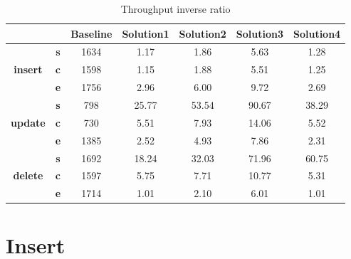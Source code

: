 \begin{table}[h]
\newcommand{\B}[1]{\colorbox{light-gray}{#1}}
 \centering
\caption{Throughput inverse ratio}\label{t:}
\begin{tabular}{ccccccc}
\toprule
&&\textbf{Baseline} & \textbf{Solution1} & \textbf{Solution2} & \textbf{Solution3} & \textbf{Solution4}\\
\midrule
\multirow{3}{*}{\textbf{insert}} & \textbf{s} & 1634 & 1.17 & 1.86 & 5.63 & 1.28\\
 & \textbf{c} & 1598 & 1.15 & 1.88 & 5.51 & 1.25\\
 & \textbf{e} & 1756 & 2.96 & 6.00 & 9.72 & 2.69\\
\midrule
\multirow{3}{*}{\textbf{update}} & \textbf{s} & 798 & 25.77 & 53.54 & 90.67 & 38.29\\
 & \textbf{c} & 730 & 5.51 & 7.93 & 14.06 & 5.52\\
 & \textbf{e} & 1385 & 2.52 & 4.93 & 7.86 & 2.31\\
\midrule
\multirow{3}{*}{\textbf{delete}} & \textbf{s} & 1692 & 18.24 & 32.03 & 71.96 & 60.75\\
 & \textbf{c} & 1597 & 5.75 & 7.71 & 10.77 & 5.31\\
 & \textbf{e} & 1714 & 1.01 & 2.10 & 6.01 & 1.01\\
\bottomrule
\end{tabular}
\end{table}


















\newcommand{\Width}{0.5\textwidth}
\section{Insert}

